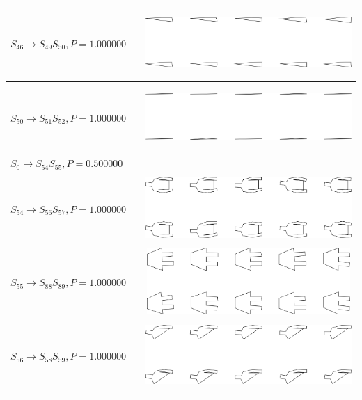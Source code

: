 \begin{tabular}{|l|c|c|}

\hline
$S_{46} \to S_{49} S_{50}, P=1.000000$ &  & \includegraphics[height=1in]{output/1.models/hand_built/romerchoice/gram.0024.sample.png} \\
\hline
$S_{50} \to S_{51} S_{52}, P=1.000000$ &  & \includegraphics[height=1in]{output/1.models/hand_built/romerchoice/gram.0025.sample.png} \\
\hline
$S_{0} \to S_{54} S_{55}, P=0.500000$ &  & \\
\hline
$S_{54} \to S_{56} S_{57}, P=1.000000$ &  & \includegraphics[height=1in]{output/1.models/hand_built/romerchoice/gram.0027.sample.png} \\
\hline
$S_{55} \to S_{88} S_{89}, P=1.000000$ &  & \includegraphics[height=1in]{output/1.models/hand_built/romerchoice/gram.0028.sample.png} \\
\hline
$S_{56} \to S_{58} S_{59}, P=1.000000$ &  & \includegraphics[height=1in]{output/1.models/hand_built/romerchoice/gram.0029.sample.png} \\
\hline
\end{tabular}

